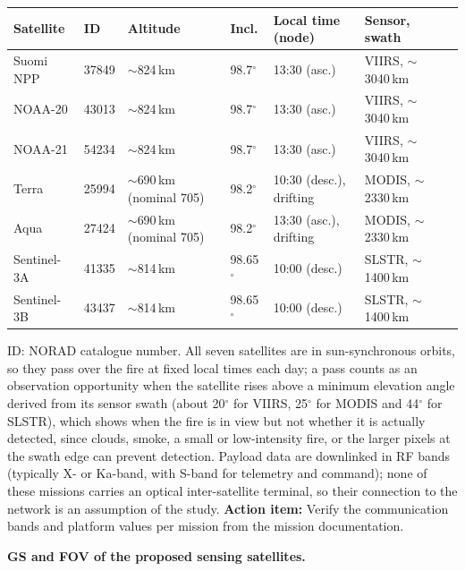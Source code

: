 \documentclass[11pt]{article}
\newcommand{\actionitem}[1]{\textcolor{todo}{\textbf{Action item:}} #1}
\begin{document}
\begin{longtable}{p{1.9cm}p{1.4cm}p{1.7cm}p{1.1cm}p{1.9cm}p{2.2cm}p{2.4cm}}
\toprule
\textbf{Satellite} & \textbf{ID} & \textbf{Altitude} & \textbf{Incl.} & \textbf{Local time (node)} & \textbf{Sensor, swath} \\
\midrule
\endhead
Suomi NPP & 37849 & $\sim$824\,km & 98.7$^\circ$ & 13:30 (asc.) & VIIRS, $\sim$3040\,km \\
NOAA-20 & 43013 & $\sim$824\,km & 98.7$^\circ$ & 13:30 (asc.) & VIIRS, $\sim$3040\,km \\
NOAA-21 & 54234 & $\sim$824\,km & 98.7$^\circ$ & 13:30 (asc.) & VIIRS, $\sim$3040\,km  \\
Terra & 25994 & $\sim$690\,km (nominal 705) & 98.2$^\circ$ & 10:30 (desc.), drifting & MODIS, $\sim$2330\,km \\
Aqua & 27424 & $\sim$690\,km (nominal 705) & 98.2$^\circ$ & 13:30 (asc.), drifting & MODIS, $\sim$2330\,km \\
Sentinel-3A & 41335 & $\sim$814\,km & 98.65$^\circ$ & 10:00 (desc.) & SLSTR, $\sim$1400\,km \\
Sentinel-3B & 43437 & $\sim$814\,km & 98.65$^\circ$ & 10:00 (desc.) & SLSTR, $\sim$1400\,km \\
\bottomrule
\end{longtable}

ID: NORAD catalogue number. All seven satellites are in sun-synchronous orbits, so they pass over the fire at fixed local times each day; a pass counts as an observation opportunity when the satellite rises above a minimum elevation angle derived from its sensor swath (about 20$^\circ$ for VIIRS, 25$^\circ$ for MODIS and 44$^\circ$ for SLSTR), which shows when the fire is in view but not whether it is actually detected, since clouds, smoke, a small or low-intensity fire, or the larger pixels at the swath edge can prevent detection. Payload data are downlinked in RF bands (typically X- or Ka-band, with S-band for telemetry and command); none of these missions carries an optical inter-satellite terminal, so their connection to the network is an assumption of the study. \actionitem{Verify the communication bands and platform values per mission from the mission documentation.}

\textbf{GS and FOV of the proposed sensing satellites.}
\end{document}
